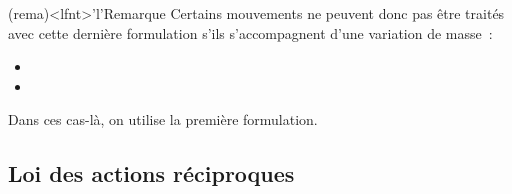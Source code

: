 \documentclass[../../main/main.tex]{subfiles}
\begin{document}
\begin{tcb*}(rema)<lfnt>'l'{Remarque}
	Certains mouvements ne peuvent donc pas être traités avec cette dernière
	formulation s'ils s'accompagnent d'une variation de masse~:
	\begin{itemize}
		\item {}
		\item {}
	\end{itemize}
	Dans ces cas-là, on utilise la première formulation.
\end{tcb*}

\subsection{Loi des actions réciproques}
\end{document}
